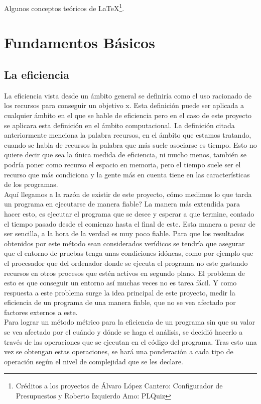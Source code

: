 

Algunos conceptos teóricos de \LaTeX \footnote{Créditos a los proyectos de Álvaro López Cantero: Configurador de Presupuestos y Roberto Izquierdo Amo: PLQuiz}.

\section{Fundamentos Básicos}

\subsection{La eficiencia}

La eficiencia vista desde un ámbito general se definiría como el uso racionado de los recursos para conseguir un objetivo x. Esta definición puede ser aplicada a cualquier ámbito en el que se hable de eficiencia pero en el caso de este proyecto se aplicara esta definición en el ámbito computacional.
La definición citada anteriormente menciona la palabra recursos, en el ámbito que estamos tratando, cuando se habla de recursos la palabra que más suele asociarse es tiempo. Esto no quiere decir que sea la única medida de eficiencia, ni mucho menos, también se podría poner como recurso el espacio en memoria, pero el tiempo suele ser el recurso que más condiciona y la gente más en cuenta tiene en las características de los  programas.\\
Aquí llegamos a la razón de existir de este proyecto, cómo medimos lo que tarda un programa en ejecutarse de manera fiable? La manera más extendida para hacer esto, es ejecutar el programa que se desee y esperar a que termine, contado el tiempo pasado desde el comienzo hasta el final de este. Esta manera a pesar de ser sencilla, a la hora de la verdad es muy poco fiable. Para que los resultados obtenidos por este método sean considerados verídicos se tendría que asegurar que el entorno de pruebas tenga unas condiciones idóneas, como por ejemplo que el procesador que del ordenador donde se ejecuta el programa no este gastando recursos en otros procesos que estén activos en segundo plano. El problema de esto es que conseguir un entorno así muchas veces no es tarea fácil. Y como respuesta a este problema surge la idea principal de este proyecto, medir la eficiencia de un programa de una manera fiable, que no se vea afectado por factores externos a este.\\
Para lograr un método métrico para la eficiencia de un programa sin que su valor se vea afectado por el cuándo y dónde se haga el análisis, se decidió hacerlo a través de las operaciones que se ejecutan en el código del programa. Tras esto una vez se obtengan estas operaciones, se hará una ponderación a cada tipo de operación según el nivel de complejidad que se les declare. 

